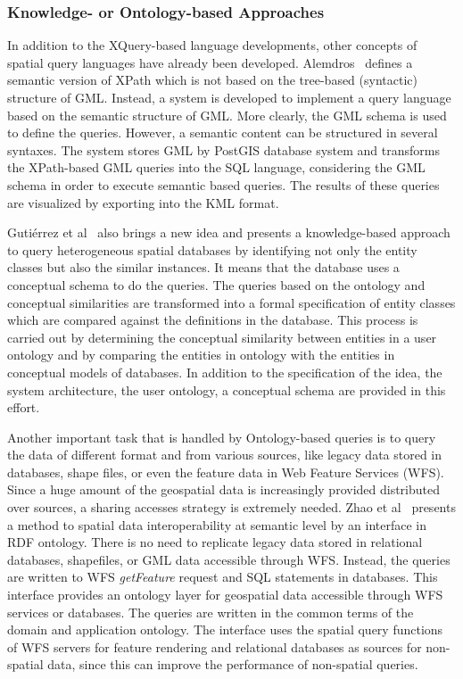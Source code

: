 \documentclass[a4paper,12pt]{article}
\begin{document}
\subsubsection{Knowledge- or Ontology-based Approaches}
\label{ontology}
In addition to the XQuery-based language developments, 
other concepts of spatial query languages have already been developed. 
Alemdros~\cite{Alemdros2011, Alemdros2013} defines a semantic version of XPath 
which is not based on the tree-based (syntactic) structure of GML. Instead, a system is developed to implement a query language based on the semantic structure of GML. More clearly, the GML schema is used to define the queries. However, a semantic content can be structured in several syntaxes. The system stores GML by PostGIS database system and transforms the XPath-based GML queries into the SQL language, considering the GML schema in order to execute semantic based queries. The results of these queries are visualized by exporting into the KML format.

{Gutiérrez et al}~\cite{Gutierrez2004} also brings a new idea and presents a knowledge-based approach 
to query heterogeneous spatial databases by identifying not only the entity classes but also the similar instances. 
It means that the database uses a conceptual schema to do the queries. 
The queries based on the ontology and conceptual similarities 
are transformed into a formal specification of entity classes 
which are compared against the definitions in the database. 
This process is carried out by determining the conceptual similarity between entities in a user ontology 
and by comparing the entities in ontology with the entities in conceptual models of databases. 
In addition to the specification of the idea, the system architecture, the user ontology, 
a conceptual schema are provided in this effort.

Another important task that is handled by Ontology-based queries is to query 
the data of different format and from various sources,
like legacy data stored in databases, shape files, 
or even the feature data in Web Feature Services (WFS).
Since a huge amount of the geospatial data is increasingly provided
distributed over sources,
a sharing accesses strategy is extremely needed.
Zhao et al~\cite{Zhao2008} presents a method to spatial data 
interoperability at semantic level by an interface in RDF ontology. 
There is no need to replicate legacy data stored in relational databases, shapefiles, or GML data accessible through WFS. Instead, the queries are written to WFS \textit{getFeature} request and SQL statements in databases. 
This interface provides an ontology layer for geospatial data accessible through WFS services or databases. 
The queries are written in the common terms of the domain and application ontology. 
The interface uses the spatial query functions of WFS servers for feature rendering and relational databases as sources for non-spatial data, since this can improve the performance of non-spatial queries. 
\end{document}

